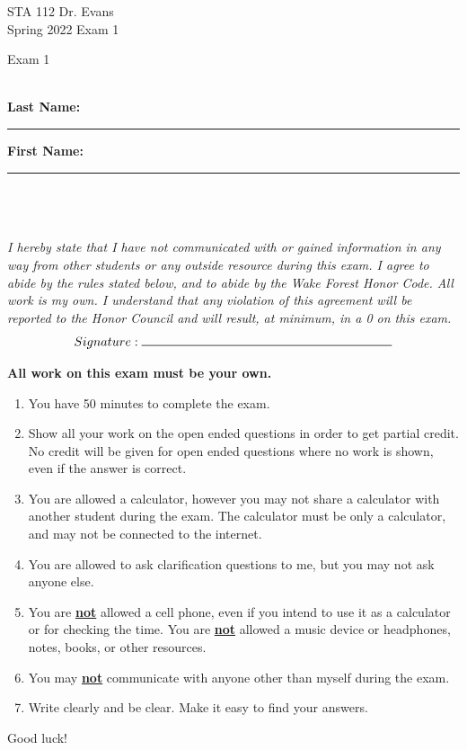 \documentclass[11pt]{article}
\newcommand{\hl}[1]{\textbf{\underline{#1}}}
\begin{document}
\begin{titlepage}

\enlargethispage{\baselineskip}


STA 112 \hfill Dr. Evans \\
Spring 2022	\hfill Exam 1\\

\vspace{-2cm}

\begin{center}
{\Huge Exam 1}	
\end{center}

$\:$ \\

\textbf{Last Name:} \rule{5cm}{0.5pt}	\hfill	 \textbf{First Name:}  \rule{5cm}{0.5pt}	 \\
$\:$ \\
$\:$ \\

\textit{I hereby state that I have not communicated with or gained information in any way from other students or any outside resource during this exam. I agree to abide by the rules stated below, and to abide by the Wake Forest Honor Code. All work is my own. I understand that any violation of this agreement will be reported to the Honor Council and will result, at minimum, in a 0 on this exam.}
\[ Signature: \rule{7cm}{0.5pt}\]

\hdashrule[0.5ex]{\textwidth}{0.5pt}{3mm}

\textbf{All work on this exam must be your own.}

{\small
\begin{enumerate}
\item You have 50 minutes to complete the exam.
\item Show all your work on the open ended questions in order to get partial credit. No credit will be given for open ended questions where no work is shown, even if the answer is correct.
\item You are allowed a calculator, however you may not share a calculator with another student during the exam. The calculator must be only a calculator, and may not be connected to the internet. 
\item You are allowed to ask clarification questions to me, but you may not ask anyone else. 
\item You are \hl{not} allowed a cell phone, even if you intend to use it as a calculator or for checking the time. You are \hl{not} allowed a music device or headphones, notes, books, or other resources. 
\item You may \hl{not} communicate with anyone other than myself during the exam.
\item Write clearly and be clear. Make it easy to find your answers. 
\end{enumerate}
}
\begin{center}
{\Large Good luck!}
\end{center}
\hdashrule[0.5ex]{\textwidth}{0.5pt}{3mm}


\end{titlepage}
\end{document}
